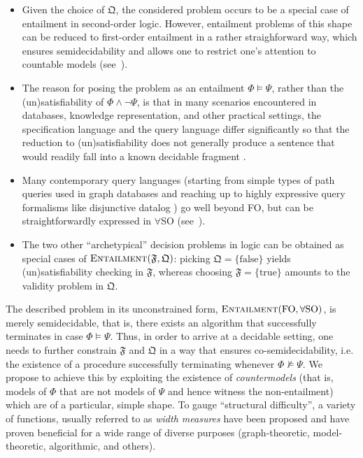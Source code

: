 \documentclass[10pt,a4paper]{amsart}
\theoremstyle{definition}
\numberwithin{equation}{section}
\theoremstyle{plain}
\theoremstyle{definition}
\theoremstyle{myexample}
\theoremstyle{plain}
\theoremstyle{definition}
\begin{document}
\begin{itemize}
\item Given the choice of $\mathfrak{Q}$, the considered problem occurs to be a special case of entailment in second-order logic.
However, entailment problems of this shape can be reduced to first-order entailment in a rather straighforward way, which  ensures semidecidability %
and allows one to restrict one's attention to countable models (see~).
 
\item The reason for posing the problem as an entailment $\Phi \models \Psi$, rather than the (un)satisfiability of $\Phi \wedge \neg \Psi$, is that in many scenarios encountered in databases, knowledge representation, and other practical settings, the specification language and the query language differ significantly so that the reduction to (un)satisfiability does not generally produce a sentence that would readily fall into a known decidable fragment \cite{%
CalvaneseGL98,CalvaneseEO09,RudolphG10,OrtizS12,BaranyGO13}.

\item Many contemporary query languages (starting from simple types of path queries used in graph databases \cite{FlorescuLS98} and reaching up to highly expressive query formalisms like disjunctive datalog \cite{EiterGM97}) go well beyond FO, but can be straightforwardly expressed in $\forall$SO (see~).

\item The two other ``archetypical'' decision problems in logic can be obtained as special cases of $\textsc{Entailment}(\mathfrak{F},\mathfrak{Q})$: picking $\mathfrak{Q}=\{\mathrm{false}\}$ yields (un)satisfiability checking in $\mathfrak{F}$, whereas choosing $\mathfrak{F}=\{\mathrm{true}\}$ amounts to the validity problem in $\mathfrak{Q}$.
\end{itemize}

The described problem in its unconstrained form, $\textsc{Entailment}(\mathrm{FO},\forall\mathrm{SO})$, is merely semidecidable, that is, there exists an algorithm that successfully terminates in case $\Phi \models \Psi$. Thus, in order to arrive at a decidable setting, one needs to further constrain $\mathfrak{F}$ and $\mathfrak{Q}$ in a way that ensures co-semidecidability, i.e. the existence of a procedure successfully terminating whenever $\Phi \not\models \Psi$. %
We propose to achieve this by exploiting the existence of \emph{countermodels} (that is, models of $\Phi$ that are not models of $\Psi$ and hence witness the non-entailment) which are of a particular, simple shape.
%
To gauge ``structural difficulty'', a variety of functions, usually referred to as \emph{width measures} have been proposed and have proven beneficial for a wide range of diverse purposes (graph-theoretic, model-theoretic, algorithmic, and others). 
\end{document}
